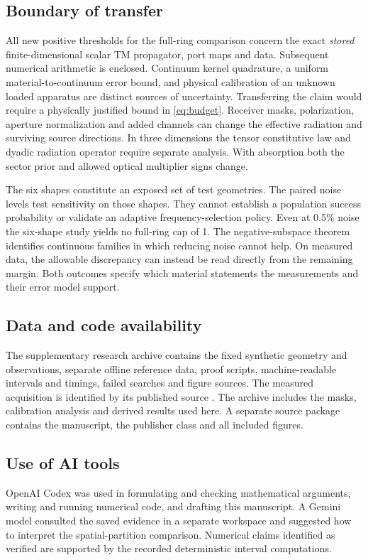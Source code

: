 \documentclass[anonymous,12pt]{iopjournal}
\theoremstyle{remark}\newtheorem{remark}[theorem]{Remark}
\numberwithin{equation}{section}
\begin{document}
\subsection{Boundary of transfer}
All new positive thresholds for the full-ring comparison concern the exact \emph{stored} finite-dimensional scalar TM propagator, port maps and data. Subsequent numerical arithmetic is enclosed. Continuum kernel quadrature, a uniform material-to-continuum error bound, and physical calibration of an unknown loaded apparatus are distinct sources of uncertainty. Transferring the claim would require a physically justified bound in \eqref{eq:budget}. Receiver masks, polarization, aperture normalization and added channels can change the effective radiation and surviving source directions. In three dimensions the tensor constitutive law and dyadic radiation operator require separate analysis. With absorption both the sector prior and allowed optical multiplier signs change.

The six shapes constitute an exposed set of test geometries. The paired noise levels test sensitivity on those shapes. They cannot establish a population success probability or validate an adaptive frequency-selection policy. Even at 0.5\% noise the six-shape study yields no full-ring cap of 1. The negative-subspace theorem identifies continuous families in which reducing noise cannot help. On measured data, the allowable discrepancy can instead be read directly from the remaining margin. Both outcomes specify which material statements the measurements and their error model support.

\subsection*{Data and code availability}
The supplementary research archive contains the fixed synthetic geometry and observations, separate offline reference data, proof scripts, machine-readable intervals and timings, failed searches and figure sources. The measured acquisition is identified by its published source \cite{fresnel}. The archive includes the masks, calibration analysis and derived results used here. A separate source package contains the manuscript, the publisher class and all included figures.

\subsection*{Use of AI tools}
OpenAI Codex was used in formulating and checking mathematical arguments, writing and running numerical code, and drafting this manuscript. A Gemini model consulted the saved evidence in a separate workspace and suggested how to interpret the spatial-partition comparison. Numerical claims identified as verified are supported by the recorded deterministic interval computations.
\end{document}
